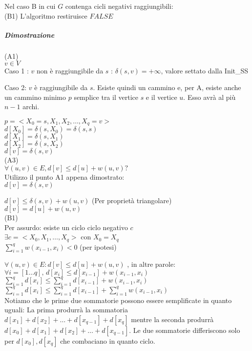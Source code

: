 Nel caso B in cui $G$ contenga cicli negativi raggiungibili: \\
(B1) L'algoritmo restiruisce $FALSE$

\subparagraph{Dimostrazione}

(A1) \\
$v \in V$ \\
Caso 1 : $v$ non è raggiungibile da $s$ : $ \delta(s,v) = + \infty $, valore settato dalla Init\_SS

Caso 2: $v$ è raggiungibile da $s$. Esiste quindi un cammino e, per A, esiste anche un cammino minimo $p$ semplice tra il vertice $s$ e il vertice $u$. Esso avrà al più $n-1$ archi.

$p = <X_0=s, X_1, X_2, \ldots, X_q=v>$ \\
$d[X_0] = \delta(s,X_0) = \delta(s,s)$ \\
$d[X_1] = \delta(s,X_1)$ \\
$d[X_2] = \delta(s,X_2)$ \\
$d[v] = \delta(s,v)$ \\

(A3) \\
$\forall (u,v) \in E, d[v] \leq d[u] + w(u,v) ? $\\
Utilizzo il punto A1 appena dimostrato:\\
$d[v] = \delta(s,v)$

$d[v] \leq \delta(s,v) + w(u,v)$ (Per proprietà triangolare)\\
$d[v] = d[u] + w(u,v)$ \\

(B1) \\
Per assurdo: esiste un ciclo ciclo negativo $c$ \\
$\exists c = <X_0,X_1,\ldots,X_q>$ con $X_0 =  X_q$ \\
$\sum_{i=1}^{q}{w(x_{i-1},x_i)} < 0$ (per ipotesi)

$\forall (u,v) \in E : d[v] \leq d[u] + w(u,v)$ , in altre parole: \\
$\forall i = [1\ldots q],\,d[x_i] \leq d[x_{i-1}] + w(x_{i-1},x_i)$ \\

$\sum_{i=1}^q{d[x_i]} \leq \sum_{i=1}^q{d[x_{i-1}] + w(x_{i-1},x_i)}$ \\

$\sum_{i=1}^q{d[x_i]} \leq \sum_{i=1}^q{d[x_{i-1}]} + \sum_{i=1}^q{w(x_{i-1},x_i)}$ \\

Notiamo che le prime due sommatorie possono essere semplificate in quanto uguali: La prima produrrà la sommatoria $d[x_1] + d[x_2] +\ldots + d[x_{q-1}] + d[x_q]$ mentre la seconda produrrà  $d[x_0] + d[x_1] + d[x_2] +\ldots + d[x_{q-1}]$. Le due sommatorie differiscono solo per $d[x_0],d[x_q]$ che combaciano in quanto ciclo.

